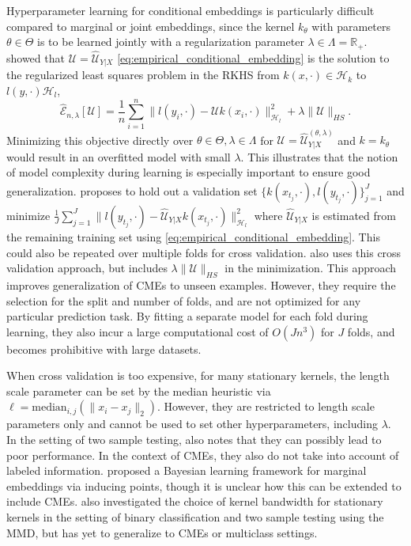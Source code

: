 \documentclass[twoside]{article}
\begin{document}
			Hyperparameter learning for conditional embeddings is particularly difficult compared to marginal or joint embeddings, since the kernel $k_{\theta}$ with parameters $\theta \in \Theta$ is to be learned jointly with a regularization parameter $\lambda \in \Lambda = \mathbb{R}_{+}$. \cite{lever2012conditional} showed that $\mathcal{U} = \hat{\mathcal{U}}_{Y | X}$ \eqref{eq:empirical_conditional_embedding} is the solution to the regularized least squares problem in the RKHS from $k(x, \cdot) \in \mathcal{H}_{k}$ to $l(y, \cdot) \mathcal{H}_{l}$, 
			\begin{equation}
				\hat{\mathcal{E}}_{n, \lambda}[\mathcal{U}] = \frac{1}{n} \sum_{i = 1}^{n} \big\| l(y_{i}, \cdot) - \mathcal{U} k(x_{i}, \cdot) \big\|_{\mathcal{H}_{l}}^{2} + \lambda \| \mathcal{U} \|_{HS}.
			\label{eq:lever_objective}
			\end{equation}
			Minimizing this objective directly over $\theta \in \Theta, \lambda \in \Lambda$ for $\mathcal{U} = \hat{\mathcal{U}}^{(\theta, \lambda)}_{Y | X}$ and $k = k_{\theta}$ would result in an overfitted model with small $\lambda$. This illustrates that the notion of model complexity during learning is especially important to ensure good generalization. \cite{lever2012conditional} proposes to hold out a validation set $\{k(x_{t_{j}}, \cdot), l(y_{t_{j}}, \cdot)\}_{j = 1}^{J}$ and minimize $\frac{1}{J} \sum_{j = 1}^{J} \big\| l(y_{t_{j}}, \cdot) - \hat{\mathcal{U}}_{Y | X} k(x_{t_{j}}, \cdot) \big\|_{\mathcal{H}_{l}}^{2}$ where $\hat{\mathcal{U}}_{Y | X}$ is estimated from the remaining training set using \eqref{eq:empirical_conditional_embedding}. This could also be repeated over multiple folds for cross validation. \cite{song2013kernel} also uses this cross validation approach, but includes $\lambda \| \mathcal{U} \|_{HS}$ in the minimization. This approach improves generalization of \glspl{CME} to unseen examples. However, they require the selection for the split and number of folds, and are not optimized for any particular prediction task. By fitting a separate model for each fold during learning, they also incur a large computational cost of $O(J n^{3})$ for $J$ folds, and becomes prohibitive with large datasets.
			
			When cross validation is too expensive, for many stationary kernels, the length scale parameter can be set by the median heuristic \citep{muandet2016kernel} via $\ell = \mathrm{median}_{i, j}(\| x_{i} - x_{j} \|_{2})$. However, they are restricted to length scale parameters only and cannot be used to set other hyperparameters, including $\lambda$. In the setting of two sample testing, \cite{gretton2012optimal} also notes that they can possibly lead to poor performance. In the context of \glspl{CME}, they also do not take into account of labeled information. \cite{flaxman2016bayesian} proposed a Bayesian learning framework for marginal embeddings via inducing points, though it is unclear how this can be extended to include \glspl{CME}. \cite{fukumizu2009kernel} also investigated the choice of kernel bandwidth for stationary kernels in the setting of binary classification and two sample testing using the \gls{MMD}, but has yet to generalize to \glspl{CME} or multiclass settings.
\end{document}
